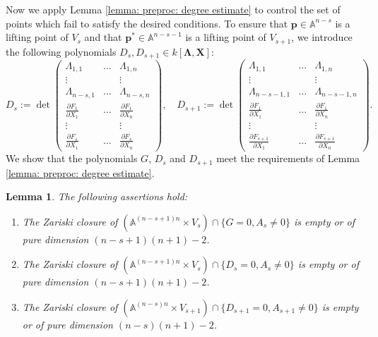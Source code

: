 \documentclass[pdflatex,sn-basic]{sn-jnl}%
\theoremstyle{thmstyleone}%
\theoremstyle{thmstyletwo}%
\theoremstyle{thmstylethree}%
\newtheorem{lemma}[theorem]{Lemma}
\theoremstyle{definition}
\numberwithin{equation}{section}
\newcommand{\bfs}{\boldsymbol}
\newcommand{\A}{\mathbb A}
\begin{document}
Now we apply Lemma \ref{lemma: preproc: degree estimate}
to control the set of points which fail to satisfy the desired conditions.
To ensure that $\bfs p\in\A^{n-s}$
is a lifting point of $V_s$ and that $\bfs p^*\in\A^{n-s-1}$
is a lifting point of $V_{s+1}$, we introduce the following
polynomials $D_s,D_{s+1}\in k[\bfs\Lambda,\bfs X]$:
$$D_s:=\det\begin{pmatrix}
  \Lambda_{1,1} & \dots & \Lambda_{1,n} \\
  \vdots &  & \vdots \\
  \Lambda_{n-s,1} & \dots & \Lambda_{n-s,n} \\
  \frac{\partial F_1}{\partial X_1} & \dots &
  \frac{\partial F_1}{\partial X_n} \\
  \vdots &  & \vdots \\
    \frac{\partial F_s}{\partial X_1} & \dots &
    \frac{\partial F_s}{\partial X_n}
\end{pmatrix},\quad
D_{s+1}:=\det\begin{pmatrix}
  \Lambda_{1,1} & \dots & \Lambda_{1,n} \\
  \vdots &  & \vdots \\
  \Lambda_{n-s-1,1} & \dots & \Lambda_{n-s-1,n} \\
  \frac{\partial F_1}{\partial X_1} & \dots &
  \frac{\partial F_1}{\partial X_n} \\
  \vdots &  & \vdots \\
    \frac{\partial F_{s+1}}{\partial X_1} & \dots &
    \frac{\partial F_{s+1}}{\partial X_n}
\end{pmatrix}.$$
%
We show that the polynomials $G$, $D_s$ and $D_{s+1}$ meet the requirements
of Lemma \ref{lemma: preproc: degree estimate}.
%
\begin{lemma}\label{lemma: preproc: D_s cuts well}
The following assertions hold:
%
\begin{enumerate}
  \item The Zariski closure of $(\A^{(n-s+1)n} \times
V_s)\cap\{G=0,A_s\not=0\}$ is empty or of pure dimension $(n-s+1)(n+1)-2$.
%
  \item The Zariski closure of $(\A^{(n-s+1)n} \times
V_s)\cap\{D_s=0,A_s\not=0\}$ is empty or of pure dimension
$(n-s+1)(n+1)-2$.
  \item The Zariski closure of
$(\A^{(n-s)n}\times V_{s+1})\cap\{D_{s+1}=0,A_{s+1}\not=0\}$ is
empty or of pure dimension $(n-s)(n+1)-2$.
\end{enumerate}
\end{lemma}
%
\end{document}

